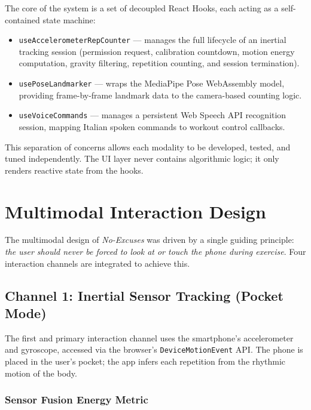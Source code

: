 \documentclass[11pt]{article}
\begin{document}
The core of the system is a set of decoupled React Hooks, each acting as a self-contained state machine:
\begin{itemize}
  \item \texttt{useAccelerometerRepCounter} — manages the full lifecycle of an inertial tracking session (permission request, calibration countdown, motion energy computation, gravity filtering, repetition counting, and session termination).
  \item \texttt{usePoseLandmarker} — wraps the MediaPipe Pose WebAssembly model, providing frame-by-frame landmark data to the camera-based counting logic.
  \item \texttt{useVoiceCommands} — manages a persistent Web Speech API recognition session, mapping Italian spoken commands to workout control callbacks.
\end{itemize}

This separation of concerns allows each modality to be developed, tested, and tuned independently. The UI layer never contains algorithmic logic; it only renders reactive state from the hooks.

\section{Multimodal Interaction Design}
\label{sec:multimodal}

The multimodal design of \textit{No-Excuses} was driven by a single guiding principle: \textit{the user should never be forced to look at or touch the phone during exercise}. Four interaction channels are integrated to achieve this.

\subsection{Channel 1: Inertial Sensor Tracking (Pocket Mode)}

The first and primary interaction channel uses the smartphone's accelerometer and gyroscope, accessed via the browser's \texttt{DeviceMotionEvent} API. The phone is placed in the user's pocket; the app infers each repetition from the rhythmic motion of the body.

\subsubsection{Sensor Fusion Energy Metric}
\end{document}
